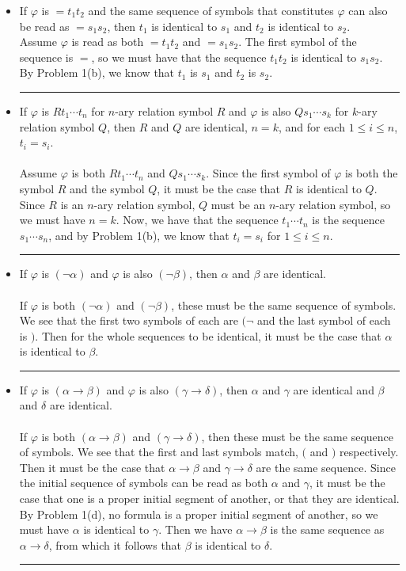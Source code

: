 \documentclass[11pt]{hmcpset}
\newenvironment{problem2}[1]{\noindent {\bf (#1}}
{\medskip}
\newenvironment{proof}{\noindent {\bf Proof:} \\}{\hfill
\rule{1mm}{3mm} \bigskip}
\begin{document}
\begin{problem2}{e)} 
\begin{itemize}
\item{If $\varphi$ is $=t_1t_2$ and the same sequence of symbols that constitutes $\varphi$ can also be read as $=s_1s_2$, then $t_1$ is identical to $s_1$ and $t_2$ is identical to $s_2$.}
\begin{proof}Assume $\varphi$ is read as both $=t_1t_2$ and $=s_1s_2$. The first symbol of the sequence is $=$, so we must have that the sequence $t_1t_2$ is identical to $s_1s_2$. By Problem 1(b), we know that $t_1$ is $s_1$ and $t_2$ is $s_2$.
\end{proof}
\item{If $\varphi$ is $Rt_1\cdots t_n$ for $n$-ary relation symbol $R$ and $\varphi$ is also $Qs_1\cdots s_k$ for $k$-ary relation symbol $Q$, then $R$ and $Q$ are identical, $n=k$, and for each $1 \le i\le n$, $t_i=s_i$.}\\
\begin{proof}Assume $\varphi$ is both $Rt_1\cdots t_n$ and $Qs_1\cdots s_k$. Since the first symbol of $\varphi$ is both the symbol $R$ and the symbol $Q$, it must be the case that $R$ is identical to $Q$. Since $R$ is an $n$-ary relation symbol, $Q$ must be an $n$-ary relation symbol, so we must have $n=k$. Now, we have that the sequence $t_1\cdots t_n$ is the sequence $s_1\cdots s_n$, and by Problem 1(b), we know that $t_i=s_i$ for $1\le i\le n$.
\end{proof}
\item{If $\varphi$ is $(\neg\alpha)$ and $\varphi$ is also $(\neg\beta)$, then $\alpha$ and $\beta$ are identical.}\\
\begin{proof} If $\varphi$ is both $(\neg\alpha)$ and $(\neg\beta)$, these must be the same sequence of symbols. We see that the first two symbols of each are $(\neg$ and the last symbol of each is $)$. Then for the whole sequences to be identical, it must be the case that $\alpha$ is identical to $\beta$.
\end{proof}
\item{If $\varphi$ is $(\alpha\to\beta)$ and $\varphi$ is also $(\gamma\to\delta)$, then $\alpha$ and $\gamma$ are identical and $\beta$ and $\delta$ are identical.}\\
\begin{proof} If $\varphi$ is both $(\alpha\to\beta)$ and $(\gamma\to\delta)$, then these must be the same sequence of symbols. We see that the first and last symbols match, $($ and $)$ respectively. Then it must be the case that $\alpha\to\beta$ and $\gamma\to\delta$ are the same sequence. Since the initial sequence of symbols can be read as both $\alpha$ and $\gamma$, it must be the case that one is a proper initial segment of another, or that they are identical. By Problem 1(d), no formula is a proper initial segment of another, so we must have $\alpha$ is identical to $\gamma$. Then we have $\alpha\to\beta$ is the same sequence as $\alpha\to\delta$, from which it follows that $\beta$ is identical to $\delta$.

\end{proof}
\end{itemize}
\end{problem2}
\end{document}
